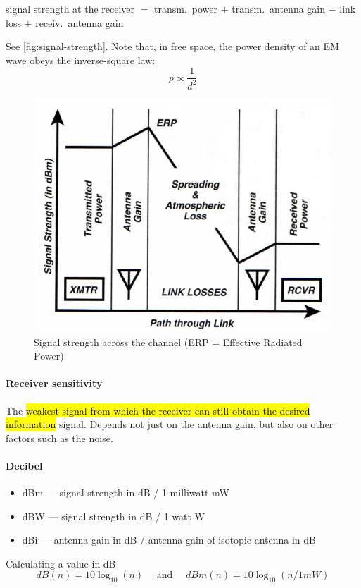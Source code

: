 signal strength at the receiver $=$ transm.\ power $+$ transm.\ antenna gain
$-$ link loss $+$ receiv.\ antenna gain

See \autoref{fig:signal-strength}.
Note that, in free space, the power density of an EM wave obeys the
inverse-square law:
\[p \propto \frac{1}{d^2} \]

\begin{figure}[h]
	\centering
	\includegraphics[scale=0.4]{images/1-signal-strength.png}
	\caption{Signal strength across the channel (ERP = Effective Radiated Power)}%
	\label{fig:signal-strength}
\end{figure}

\paragraph{Receiver sensitivity}
The \hl{weakest signal from which the receiver can still obtain the desired
	information} signal. Depends not just on the antenna gain, but also on other
factors such as the noise.

\paragraph{Decibel}
\begin{itemize}
	\item dBm --- signal strength in dB / 1 milliwatt mW
	\item dBW --- signal strength in dB / 1 watt W
	\item dBi --- antenna gain in dB / antenna gain of isotopic antenna in dB
\end{itemize}
Calculating a value in dB \[ dB(n) = 10 \log_{10} (n) \quad \text{ and } \quad dBm(n) = 10 \log_{10} (n / 1 mW) \]

